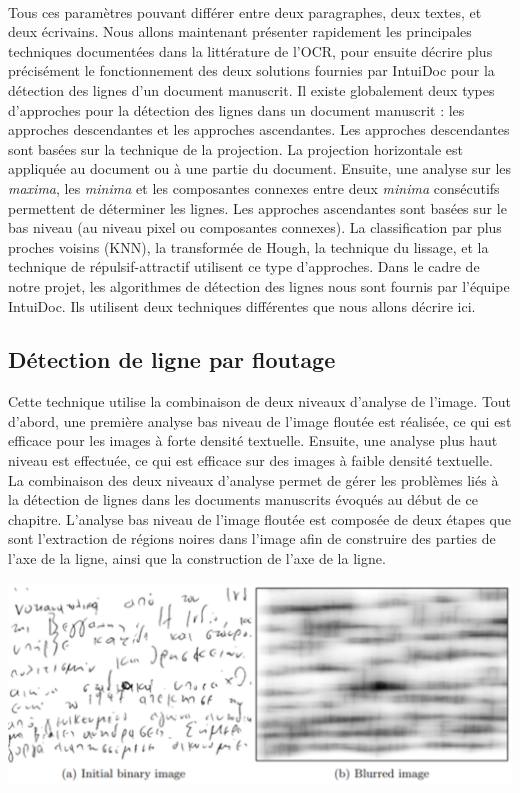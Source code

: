 \paragraph{}
Tous ces paramètres pouvant différer entre deux paragraphes, deux textes, et deux écrivains. Nous allons maintenant
présenter rapidement les principales techniques documentées dans la littérature de l'OCR, pour ensuite décrire plus
précisément le fonctionnement des deux solutions fournies par IntuiDoc pour la détection des lignes d'un document manuscrit.
Il existe globalement deux types d'approches pour la détection des lignes dans un document manuscrit : les approches
descendantes et les approches ascendantes. Les approches descendantes sont basées sur la technique de la projection.
La projection horizontale est appliquée au document ou à une partie du document. Ensuite, une analyse sur les \textit{maxima},
les \textit{minima} et les composantes connexes entre deux \textit{minima} consécutifs permettent de déterminer les lignes.
Les approches ascendantes sont basées sur le bas niveau (au niveau pixel ou composantes connexes). La classification
par plus proches voisins (KNN), la transformée de Hough, la technique du lissage, et la technique de répulsif-attractif
utilisent ce type d'approches. Dans le cadre de notre projet, les algorithmes de détection des lignes nous sont
fournis par l'équipe IntuiDoc. Ils utilisent deux techniques différentes que nous allons décrire ici.

\subsection{Détection de ligne par floutage}

Cette technique utilise la combinaison de deux niveaux d'analyse de l'image. Tout d'abord, une première analyse bas niveau
de l'image floutée est réalisée, ce qui est efficace pour les images à forte densité textuelle. Ensuite, une analyse plus
haut niveau est effectuée, ce qui est efficace sur des images à faible densité textuelle. La combinaison des deux niveaux
d'analyse permet de gérer les problèmes liés à la détection de lignes dans les documents manuscrits évoqués au début de ce chapitre.
L'analyse bas niveau de l'image floutée est composée de deux étapes que sont l'extraction de régions noires dans l'image afin de
construire des parties de l'axe de la ligne, ainsi que la construction de l'axe de la ligne.

\begin{mdframed}[innerbottommargin=10]
\begin{center}
\includegraphics[width=0.6\linewidth]{detect1.png}
\end{center}
\end{mdframed}

